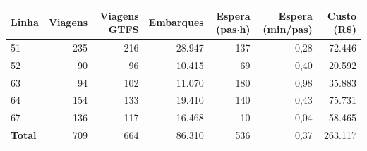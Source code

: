 \begin{tabular}{lrrrrrr}
\toprule
Linha & Viagens & Viagens GTFS & Embarques & Espera (pas$\cdot$h) & Espera (min/pas) & Custo (R\$) \\
\midrule
51 & 235 & 216 & 28.947 & 137 & 0{,}28 & 72.446 \\
52 & 90 & 96 & 10.415 & 69 & 0{,}40 & 20.592 \\
63 & 94 & 102 & 11.070 & 180 & 0{,}98 & 35.883 \\
64 & 154 & 133 & 19.410 & 140 & 0{,}43 & 75.731 \\
67 & 136 & 117 & 16.468 & 10 & 0{,}04 & 58.465 \\
\midrule
\textbf{Total} & 709 & 664 & 86.310 & 536 & 0{,}37 & 263.117 \\
\bottomrule
\end{tabular}
